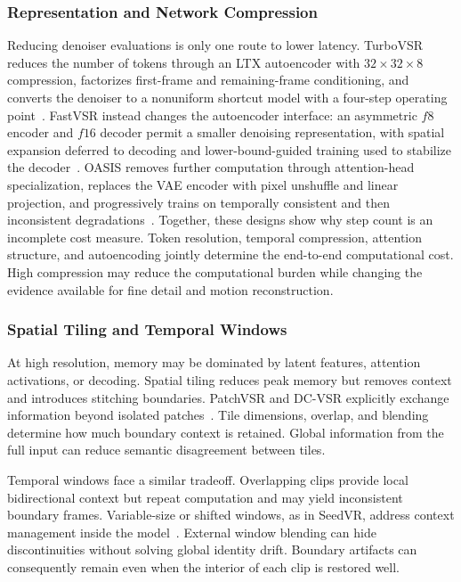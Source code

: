 \subsubsection{Representation and Network Compression}
Reducing denoiser evaluations is only one route to lower latency. TurboVSR reduces the number of tokens through an LTX autoencoder with $32\times32\times8$ compression, factorizes first-frame and remaining-frame conditioning, and converts the denoiser to a nonuniform shortcut model with a four-step operating point~\cite{turbo}. FastVSR instead changes the autoencoder interface: an asymmetric $f8$ encoder and $f16$ decoder permit a smaller denoising representation, with spatial expansion deferred to decoding and lower-bound-guided training used to stabilize the decoder~\cite{fastvsr}. OASIS removes further computation through attention-head specialization, replaces the VAE encoder with pixel unshuffle and linear projection, and progressively trains on temporally consistent and then inconsistent degradations~\cite{oasis}. Together, these designs show why step count is an incomplete cost measure. Token resolution, temporal compression, attention structure, and autoencoding jointly determine the end-to-end computational cost. High compression may reduce the computational burden while changing the evidence available for fine detail and motion reconstruction.

\subsubsection{Spatial Tiling and Temporal Windows}
At high resolution, memory may be dominated by latent features, attention activations, or decoding. Spatial tiling reduces peak memory but removes context and introduces stitching boundaries. PatchVSR and DC-VSR explicitly exchange information beyond isolated patches~\cite{patch,dcvsr}. Tile dimensions, overlap, and blending determine how much boundary context is retained. Global information from the full input can reduce semantic disagreement between tiles.

Temporal windows face a similar tradeoff. Overlapping clips provide local bidirectional context but repeat computation and may yield inconsistent boundary frames. Variable-size or shifted windows, as in SeedVR, address context management inside the model~\cite{seedvr}. External window blending can hide discontinuities without solving global identity drift. Boundary artifacts can consequently remain even when the interior of each clip is restored well.

